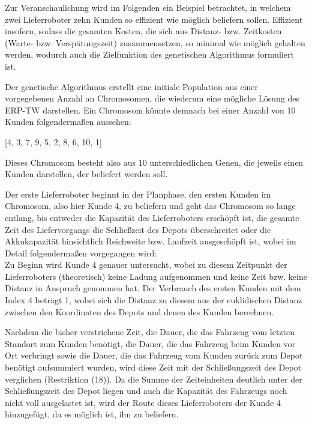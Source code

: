 \documentclass[a4paper,12pt,parskip,bibtotoc,liststotoc]{article}
\begin{document}
Zur Veranschaulichung wird im Folgenden ein Beispiel betrachtet, in welchem zwei Lieferroboter zehn Kunden so effizient wie möglich beliefern sollen.
Effizient insofern, sodass die gesamten Kosten, die sich aus Distanz- bzw. Zeitkosten (Warte- bzw. Verspätungszeit) zusammensetzen, so minimal wie möglich gehalten werden, wodurch auch die Zielfunktion des genetischen Algorithmus formuliert ist. 

Der genetische Algorithmus erstellt eine initiale Population aus einer vorgegebenen Anzahl an Chromosomen, die wiederum eine mögliche Lösung des ERP-TW darstellen. 
Ein Chromosom könnte demnach bei einer Anzahl von 10 Kunden folgendermaßen aussehen:

\begin{center}
[4, 3, 7, 9, 5, 2, 8, 6, 10, 1]

\end{center}

Dieses Chromosom besteht also aus 10 unterschiedlichen Genen, die jeweils einen Kunden darstellen, der beliefert werden soll.
 
Der erste Lieferroboter beginnt in der Planphase, den ersten Kunden im Chromosom, also hier Kunde 4, zu beliefern und geht das Chromosom so lange entlang, bis entweder die Kapazität des Lieferroboters erschöpft ist, die gesamte Zeit des Liefervorgangs die Schließzeit des Depots überschreitet oder die Akkukapazität hinsichtlich Reichweite bzw. Laufzeit ausgeschöpft ist, wobei im Detail folgendermaßen vorgegangen wird:\\
 
Zu Beginn wird Kunde 4 genauer untersucht, wobei zu diesem Zeitpunkt der Lieferroboters (theoretisch) keine Ladung aufgenommen und keine Zeit bzw. keine Distanz in Anspruch genommen hat.
Der Verbrauch des ersten Kunden mit dem Index 4 beträgt 1, wobei sich die Distanz zu diesem aus der euklidischen Distanz zwischen den Koordinaten des Depots und denen des Kunden berechnen.

Nachdem die bisher verstrichene Zeit, die Dauer, die das Fahrzeug vom letzten Standort zum Kunden benötigt, die Dauer, die das Fahrzeug beim Kunden vor Ort verbringt sowie die Dauer, die das Fahrzeug vom Kunden zurück zum Depot benötigt aufsummiert wurden, wird diese Zeit mit der Schließungszeit des Depot verglichen (Restriktion (18)). 
Da die Summe der Zeiteinheiten deutlich unter der Schließungszeit des Depot liegen und auch die Kapazität des Fahrzeugs noch nicht voll ausgelastet ist, wird der Route dieses Lieferroboters der Kunde 4 hinzugefügt, da es möglich ist, ihn zu beliefern.
\end{document}
